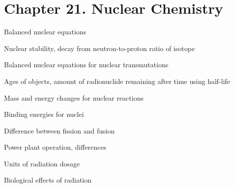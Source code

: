 \section{Chapter 21. Nuclear Chemistry}

{\footnotesize
\begin{multicols}{3}
\begin{compactenum}
\item Balanced nuclear equations
\item Nuclear stability, decay from neutron-to-proton ratio of isotope
\item Balanced nuclear equations for nuclear transmutations
\item Ages of objects, amount of radionuclide remaining after time using
    half-life
\item  Mass and energy changes for nuclear reactions
\item  Binding energies for nuclei
\item  Difference between fission and fusion
\item  Power plant operation, differences
\item  Units of radiation dosage
\item  Biological effects of radiation
\end{compactenum}
\end{multicols}
}
